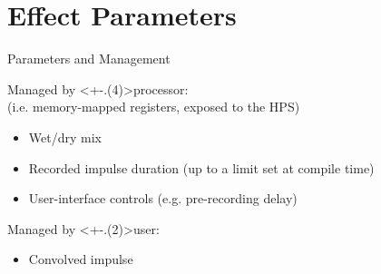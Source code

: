 \section{Effect Parameters}


\begin{frame}{Parameters and Management}

    Managed by \alert<+-.(4)>{processor}: \\
    (i.e. memory-mapped registers, exposed to the HPS)

    \begin{itemize}[<+->]
        \item Wet/dry mix
        \item Recorded impulse duration (up to a limit set at compile time)
        \item User-interface controls (e.g. pre-recording delay)
    \end{itemize}

    Managed by \alert<+-.(2)>{user}:

    \begin{itemize}[<+->]
        \item Convolved impulse
    \end{itemize}

\end{frame}
